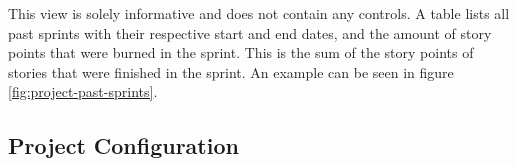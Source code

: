 \documentclass[
	accentcolor=tud1a %
]{tudreport}
\begin{document}

This view is solely informative and does not contain any controls. A table lists all past sprints with their respective start and end dates, and the amount of story points that were burned in the sprint. This is the sum of the story points of stories that were finished in the sprint. An example can be seen in figure \ref{fig:project-past-sprints}.

\subsection{Project Configuration}
\label{sec:proj-config}

\end{document}
